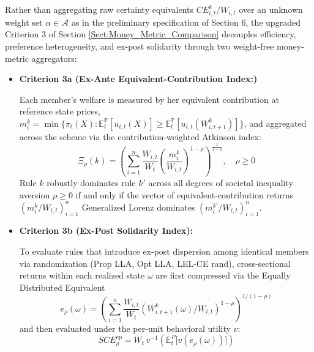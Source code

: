 \documentclass[11pt,a4paper]{article}
\theoremstyle{definition}
\theoremstyle{plain}
\theoremstyle{remark}
\newcommand{\E}{\mathbb{E}}
\renewcommand{\P}{\mathbb{P}}
\newcommand{\1}{\mathbf{1}}
\begin{document}
\begin{enumerate}
    Rather than aggregating raw certainty equivalents $CE_{i,t}^k / W_{i,t}$ over an unknown weight set $\alpha \in \mathcal{A}$ as in the preliminary specification of Section 6, the upgraded Criterion 3 of Section \ref{Sect:Money_Metric_Comparison} decouples efficiency, preference heterogeneity, and ex-post solidarity through two weight-free money-metric aggregators:
    \begin{itemize}
        \item \textbf{Criterion 3a (Ex-Ante Equivalent-Contribution Index:)}
        
        Each member's welfare is measured by her equivalent contribution at reference state prices, $m_i^k = \min\{\pi_t(X) : \E_t^{\P}[u_{i,t}(X)] \geq \E_t^{\P}[u_{i,t}(W_{i,t+1}^k)]\}$, and aggregated across the scheme via the contribution-weighted Atkinson index:
        \begin{equation}
            \Xi_\rho(k) = \left( \sum_{i=1}^n \frac{W_{i,t}}{W_t} \left( \frac{m_i^k}{W_{i,t}} \right)^{1-\rho} \right)^{\frac{1}{1-\rho}}, \quad \rho \ge 0
        \end{equation}
        Rule $k$ robustly dominates rule $k'$ across all degrees of societal inequality aversion $\rho \ge 0$ if and only if the vector of equivalent-contribution returns $(m_i^k / W_{i,t})_{i=1}^n$ Generalized Lorenz dominates $(m_i^{k'} / W_{i,t})_{i=1}^n$.

        \item \textbf{Criterion 3b (Ex-Post Solidarity Index):}
        
        To evaluate rules that introduce ex-post dispersion among identical members via randomization (Prop LLA, Opt LLA, LEL-CE rand), cross-sectional returns within each realized state $\omega$ are first compressed via the Equally Distributed Equivalent
        \begin{equation*}
            e_\rho(\omega) = \left(\sum_{i=1}^n \frac{W_{i,t}}{W_t} (W_{i,t+1}^k(\omega)/W_{i,t})^{1-\rho}\right)^{1/(1-\rho)}
        \end{equation*}
        and then evaluated under the per-unit behavioral utility $v$:
        \begin{equation}
            SCE_\rho^{\text{ep}} = W_t \, v^{-1}\left( \E_t^{P}\big[ v(e_\rho(\omega)) \big] \right)
        \end{equation}
    \end{itemize}
\end{enumerate}
\end{document}
